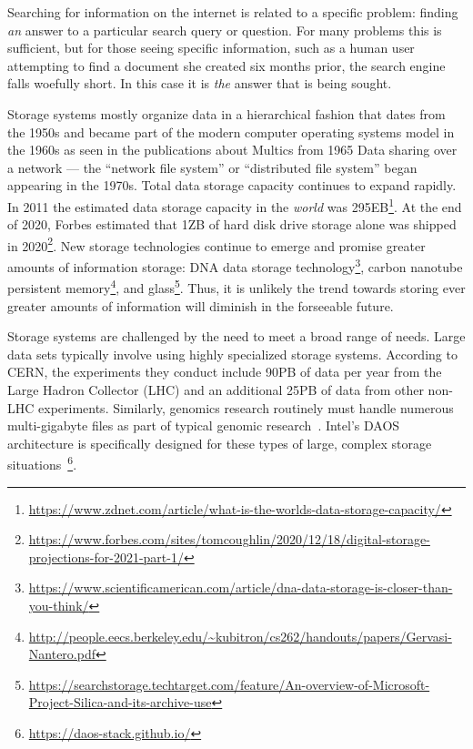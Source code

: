 Searching for information on the internet is related to a specific problem:
finding \emph{an} answer to a particular search query or question.  For many
problems this is sufficient, but for those seeing specific information, such as
a human user attempting to find a document she created six months prior, the
search engine falls woefully short.  In this case it is \emph{the} answer that
is being sought.

Storage systems mostly organize data in a hierarchical fashion that dates from
the 1950s and became part of the modern computer operating systems model in the
1960s as seen in the publications about Multics from 1965  Data sharing over a network --- the ``network file system'' or
``distributed file system'' began appearing in the 1970s.  Total data storage
capacity continues to expand rapidly.  In 2011 the estimated data
storage capacity in the \emph{world} was
295EB\footnote{\url{https://www.zdnet.com/article/what-is-the-worlds-data-storage-capacity/}}.
At the end of 2020, Forbes estimated that 1ZB of
hard disk drive storage alone was shipped in
2020\footnote{\url{https://www.forbes.com/sites/tomcoughlin/2020/12/18/digital-storage-projections-for-2021-part-1/}}.
New storage technologies continue to emerge and promise greater amounts of
information storage:  DNA data storage
technology\footnote{\url{https://www.scientificamerican.com/article/dna-data-storage-is-closer-than-you-think/}},
carbon nanotube persistent
memory\footnote{\url{http://people.eecs.berkeley.edu/~kubitron/cs262/handouts/papers/Gervasi-Nantero.pdf}},
and
glass\footnote{\url{https://searchstorage.techtarget.com/feature/An-overview-of-Microsoft-Project-Silica-and-its-archive-use}}.
Thus, it is unlikely the trend towards storing ever greater amounts of
information will diminish in the forseeable future.

Storage systems are challenged by the need to meet a broad range of needs. Large
data sets typically involve using highly specialized storage systems.
According to CERN, the experiments they conduct include 90PB of data per year
from the Large Hadron Collector (LHC) and an additional 25PB of data from other
non-LHC experiments. Similarly, genomics research routinely must handle numerous
multi-gigabyte files as part of typical genomic
research~\cite{todesco2020massive}. Intel's DAOS architecture is specifically
designed for these types of large, complex storage
situations~\footnote{\url{https://daos-stack.github.io/}}.

